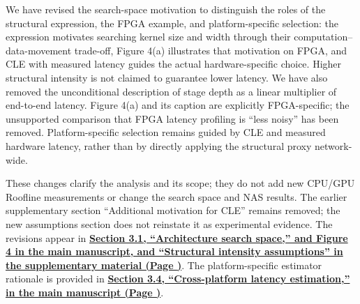 \documentclass[11pt]{article}
\newcommand{\finishresponse}{\par\color{black}\vspace{5mm}}
\newcommand{\revloc}[1]{%
  \textcolor{revisionred}{\textbf{\uline{#1}}}}
\begin{document}
\begin{enumerate}[leftmargin=0pt,label={},itemsep=5mm]
We have revised the search-space motivation to distinguish the roles of the structural expression, the FPGA example, and platform-specific selection: the expression motivates searching kernel size and width through their computation--data-movement trade-off, Figure 4(a) illustrates that motivation on FPGA, and CLE with measured latency guides the actual hardware-specific choice. Higher structural intensity is not claimed to guarantee lower latency. We have also removed the unconditional description of stage depth as a linear multiplier of end-to-end latency. Figure 4(a) and its caption are explicitly FPGA-specific; the unsupported comparison that FPGA latency profiling is ``less noisy'' has been removed. Platform-specific selection remains guided by CLE and measured hardware latency, rather than by directly applying the structural proxy network-wide.

These changes clarify the analysis and its scope; they do not add new CPU/GPU Roofline measurements or change the search space and NAS results. The earlier supplementary section ``Additional motivation for CLE'' remains removed; the new assumptions section does not reinstate it as experimental evidence. The revisions appear in \revloc{Section 3.1, ``Architecture search space,'' and Figure 4 in the main manuscript, and ``Structural intensity assumptions'' in the supplementary material (Page \underline{\hspace{1cm}})}. The platform-specific estimator rationale is provided in \revloc{Section 3.4, ``Cross-platform latency estimation,'' in the main manuscript (Page \underline{\hspace{1cm}})}.
\par\endgroup
\finishresponse
\end{enumerate}




\clearpage

\end{document}
